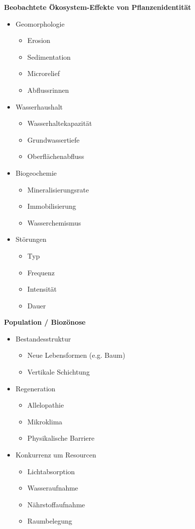 \textbf{Beobachtete Ökosystem-Effekte von Pflanzenidentität}\\
\begin{itemize}
	\item Geomorphologie
	\begin{itemize}
		\item Erosion
		\item Sedimentation
		\item Microrelief
		\item Abflussrinnen
	\end{itemize}
	\item Wasserhaushalt
	\begin{itemize}
		\item Wasserhaltekapazität
		\item Grundwassertiefe
		\item Oberflächenabfluss
	\end{itemize}
	\item Biogeochemie
	\begin{itemize}
		\item Mineralisierungsrate
		\item Immobilisierung
		\item Wasserchemismus
	\end{itemize}
	\item Störungen
	\begin{itemize}
		\item Typ
		\item Frequenz
		\item Intensität
		\item Dauer
	\end{itemize}
\end{itemize}

\textbf{Population / Biozönose}
\begin{itemize}
	\item Bestandesstruktur
	\begin{itemize}
		\item Neue Lebensformen (e.g. Baum)
		\item Vertikale Schichtung
	\end{itemize}
	\item Regeneration
	\begin{itemize}
		\item Allelopathie
		\item Mikroklima
		\item Physikalische Barriere
	\end{itemize}
	\item Konkurrenz um Resourcen
	\begin{itemize}
		\item Lichtabsorption
		\item Wasseraufnahme
		\item Nährstoffaufnahme
		\item Raumbelegung
	\end{itemize}
\end{itemize}